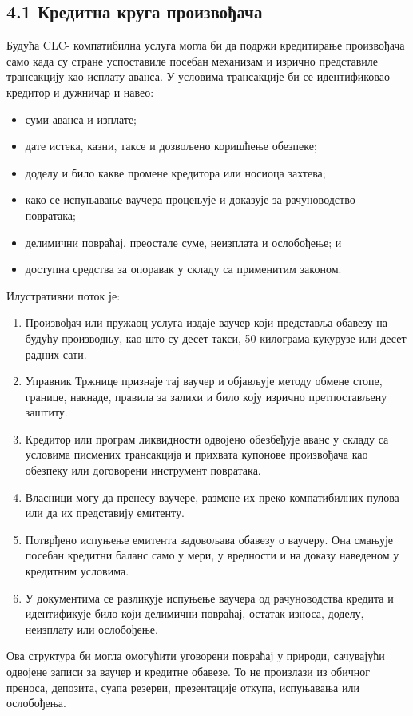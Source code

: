\documentclass[11pt]{article}
\begin{document}
\subsection*{4.1 Кредитна круга произвођача}

Будућа CLC- компатибилна услуга могла би да подржи кредитирање произвођача само када су стране успоставиле посебан механизам и изрично представиле трансакцију као исплату аванса. У условима трансакције би се идентификовао кредитор и дужничар и навео:

\begin{itemize}[leftmargin=*]
\item суми аванса и изплате;
\item дате истека, казни, таксе и дозвољено коришћење обезпеке;
\item доделу и било какве промене кредитора или носиоца захтева;
\item како се испуњавање ваучера процењује и доказује за рачуноводство повратака;
\item делимични повраћај, преостале суме, неизплата и ослобођење; и
\item доступна средства за опоравак у складу са применитим законом.
\end{itemize}
Илустративни поток је:

\begin{enumerate}[leftmargin=*]
\item Произвођач или пружаоц услуга издаје ваучер који представља обавезу на будућу производњу, као што су десет такси, 50 килограма кукурузе или десет радних сати.
\item Управник Тржнице признаје тај ваучер и објављује методу обмене стопе, границе, накнаде, правила за залихи и било коју изрично претпостављену заштиту.
\item Кредитор или програм ликвидности одвојено обезбеђује аванс у складу са условима писмених трансакција и прихвата купонове произвођача као обезпеку или договорени инструмент повратака.
\item Власници могу да пренесу ваучере, размене их преко компатибилних пулова или да их представију емитенту.
\item Потврђено испуњење емитента задовољава обавезу о ваучеру. Она смањује посебан кредитни баланс само у мери, у вредности и на доказу наведеном у кредитним условима.
\item У документима се разликује испуњење ваучера од рачуноводства кредита и идентификује било који делимични повраћај, остатак износа, доделу, неизплату или ослобођење.
\end{enumerate}
Ова структура би могла омогућити уговорени повраћај у природи, сачувајући одвојене записи за ваучер и кредитне обавезе. То не произлази из обичног преноса, депозита, суапа резерви, презентације откупа, испуњавања или ослобођења.
\end{document}
